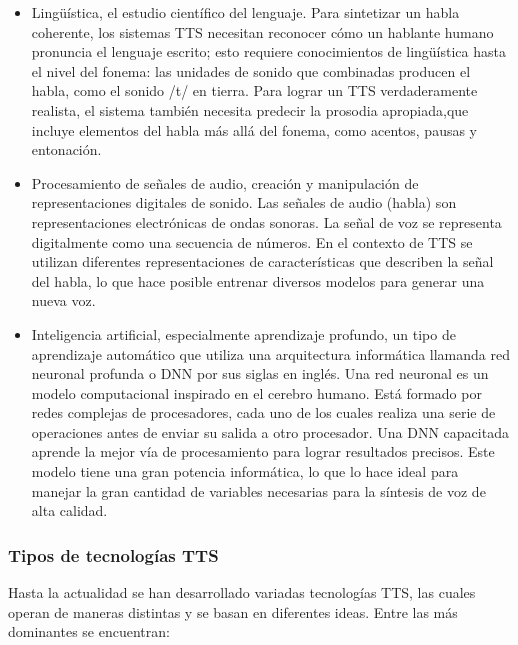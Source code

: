 \begin{itemize}
	\item Lingüística, el estudio científico del lenguaje. Para sintetizar un habla coherente, los sistemas TTS necesitan reconocer cómo un hablante humano pronuncia el lenguaje escrito; esto requiere conocimientos de lingüística hasta el nivel del fonema: las unidades de sonido que combinadas producen el habla, como el sonido /t/ en tierra. Para lograr un TTS verdaderamente realista, el sistema también necesita predecir la prosodia apropiada,que incluye elementos del habla más allá del fonema, como acentos, pausas y entonación.
	
	\item Procesamiento de señales de audio, creación y manipulación de representaciones digitales de sonido. Las señales de audio (habla) son representaciones electrónicas de ondas sonoras. La señal de voz se representa digitalmente como una secuencia de números. En el contexto de TTS se utilizan diferentes representaciones de características que describen la señal del habla, lo que hace posible entrenar diversos modelos para generar una nueva voz.
	
	\item Inteligencia artificial, especialmente aprendizaje profundo, un tipo de aprendizaje automático que utiliza una arquitectura informática llamanda red neuronal profunda o DNN por sus siglas en inglés. Una red neuronal es un modelo computacional inspirado en el cerebro humano. Está formado por redes complejas de procesadores, cada uno de los cuales realiza una serie de operaciones antes de enviar su salida a otro procesador. Una DNN capacitada aprende la mejor vía de procesamiento para lograr resultados precisos. Este modelo tiene una gran potencia informática, lo que lo hace ideal para manejar la gran cantidad de variables necesarias para la síntesis de voz de alta calidad.
\end{itemize}

\subsubsection*{Tipos de tecnologías TTS}

Hasta la actualidad se han desarrollado variadas tecnologías TTS, las cuales operan de maneras distintas y se basan en diferentes ideas. Entre las más dominantes se encuentran: 

